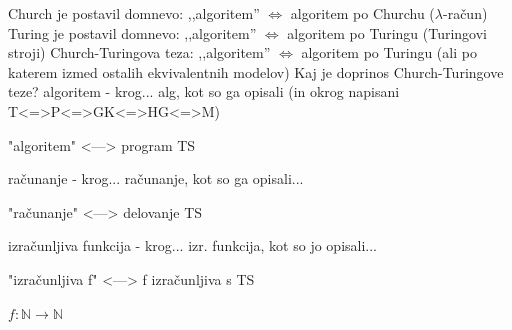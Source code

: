 \documentclass[10pt,a4paper,oneside]{book}
\begin{document}
Church je postavil domnevo: ,,algoritem'' {\bf$\Longleftrightarrow$} algoritem po Churchu ($\lambda$-račun)\\%
Turing je postavil domnevo: ,,algoritem''  {\bf$\Longleftrightarrow$} algoritem po Turingu (Turingovi stroji)
\br
Church-Turingova teza: ,,algoritem'' {\bf$\Longleftrightarrow$} algoritem po Turingu (ali po katerem izmed ostalih ekvivalentnih modelov)%
\br
Kaj je doprinos Church-Turingove teze?
algoritem%
\fixme - krog... alg, kot so ga opisali (in okrog napisani T<=>P<=>GK<=>HG<=>M)

"algoritem" <---> program TS%


računanje%
\fixme - krog... računanje, kot so ga opisali...%

"računanje" <---> delovanje TS%


izračunljiva funkcija%
\fixme - krog... izr. funkcija, kot so jo opisali...%

"izračunljiva f" <---> f izračunljiva s TS%


$f:\mathbb{N}\rightarrow\mathbb{N}$%

\end{document}
